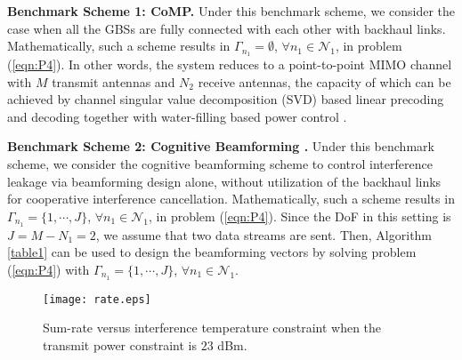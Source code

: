 \documentclass[onecolumn, draftclsnofoot, 12pt]{IEEEtran}
\begin{document}
\textbf{Benchmark Scheme 1: CoMP.} Under this benchmark scheme, we consider the case when all the GBSs are fully connected with each other with backhaul links. Mathematically, such a scheme results in $\Gamma_{n_1}=\emptyset$, $\forall n_1\in \mathcal{N}_1$, in problem (\ref{eqn:P4}). In other words, the system reduces to a point-to-point MIMO channel with $M$ transmit antennas and $N_2$ receive antennas, the capacity of which can be achieved by channel singular value decomposition (SVD) based linear precoding and decoding together with water-filling based power control \cite{Cover}.

\textbf{Benchmark Scheme 2: Cognitive Beamforming \cite{Interference_Temperature}.} Under this benchmark scheme, we consider the cognitive beamforming scheme \cite{Interference_Temperature} to control interference leakage via beamforming design alone, without utilization of the backhaul links for cooperative interference cancellation.  Mathematically, such a scheme results in $\Gamma_{n_1}=\{1,\cdots,J\}$, $\forall n_1\in \mathcal{N}_1$, in problem (\ref{eqn:P4}). Since the DoF in this setting is $J=M-N_1=2$, we assume that two data streams are sent. Then, Algorithm \ref{table1} can be used to design the beamforming vectors by solving problem (\ref{eqn:P4}) with $\Gamma_{n_1}=\{1,\cdots,J\}$, $\forall n_1\in \mathcal{N}_1$.

\begin{figure}[t]
  \centering
  \texttt{[image: rate.eps]}
  \caption{Sum-rate versus interference temperature constraint when the transmit power constraint is $23$ dBm.}\label{fig_rate}
\end{figure}
\end{document}
